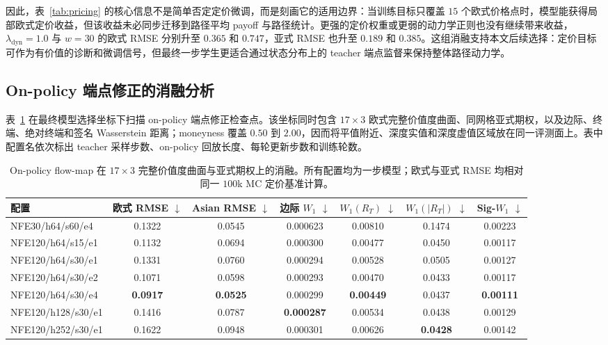\documentclass[11pt]{ctexart}
\newcommand{\tablebodysetup}{\footnotesize\setlength{\tabcolsep}{2pt}\renewcommand{\arraystretch}{1.12}}
\newcommand{\best}[1]{\textbf{#1}}
\begin{document}
因此，表~\ref{tab:pricing} 的核心信息不是简单否定定价微调，而是刻画它的适用边界：当训练目标只覆盖 $15$ 个欧式价格点时，模型能获得局部欧式定价收益，但该收益未必同步迁移到路径平均 payoff 与路径统计。更强的定价权重或更弱的动力学正则也没有继续带来收益，$\lambda_{\mathrm{dyn}}{=}1.0$ 与 $w{=}30$ 的欧式 RMSE 分别升至 $0.365$ 和 $0.747$，亚式 RMSE 也升至 $0.189$ 和 $0.385$。这组消融支持本文后续选择：定价目标可作为有价值的诊断和微调信号，但最终一步学生更适合通过状态分布上的 teacher 端点监督来保持整体路径动力学。

\subsection{On-policy 端点修正的消融分析}
\label{sec:res_onpolicy}
表~\ref{tab:onpolicy_ablation} 在最终模型选择坐标下扫描 on-policy 端点修正检查点。该坐标同时包含 $17\times3$ 欧式完整价值度曲面、同网格亚式期权，以及边际、终端、绝对终端和签名 Wasserstein 距离；moneyness 覆盖 $0.50$ 到 $2.00$，因而将平值附近、深度实值和深度虚值区域放在同一评测面上。表中配置名依次标出 teacher 采样步数、on-policy 回放长度、每轮更新步数和训练轮数。

\begin{table}[htbp]
\centering
\caption{On-policy flow-map 在 $17\times3$ 完整价值度曲面与亚式期权上的消融。所有配置均为一步模型；欧式与亚式 RMSE 均相对同一 $100$k MC 定价基准计算。}
\label{tab:onpolicy_ablation}
\tablebodysetup
\begin{tabular}{l c c c c c c}
\toprule
配置 & 欧式 RMSE $\downarrow$ & Asian RMSE $\downarrow$ & 边际 $W_1$ $\downarrow$ & $W_1(R_T)$ $\downarrow$ & $W_1(|R_T|)$ $\downarrow$ & Sig-$W_1$ $\downarrow$ \\
\midrule
NFE30/h64/s60/e4 & 0.1322 & 0.0545 & 0.000623 & 0.00810 & 0.1474 & 0.00223 \\
NFE120/h64/s15/e1 & 0.1132 & 0.0694 & 0.000300 & 0.00477 & 0.0450 & 0.00117 \\
NFE120/h64/s30/e1 & 0.1331 & 0.0760 & 0.000294 & 0.00528 & 0.0505 & 0.00127 \\
NFE120/h64/s30/e2 & 0.1071 & 0.0598 & 0.000293 & 0.00470 & 0.0433 & 0.00117 \\
NFE120/h64/s30/e4 & \best{0.0917} & \best{0.0525} & 0.000299 & \best{0.00449} & 0.0437 & \best{0.00111} \\
NFE120/h128/s30/e1 & 0.1416 & 0.0787 & \best{0.000287} & 0.00534 & 0.0438 & 0.00129 \\
NFE120/h252/s30/e1 & 0.1622 & 0.0948 & 0.000301 & 0.00626 & \best{0.0428} & 0.00142 \\
\bottomrule
\end{tabular}
\end{table}
\end{document}
